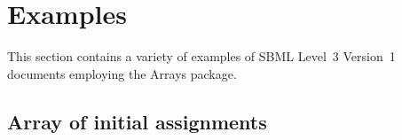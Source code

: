 %
\section{Examples}
\label{examples}

This section contains a variety of examples of SBML Level~3 Version~1
documents employing the Arrays package.

\subsection{Array of initial assignments}


